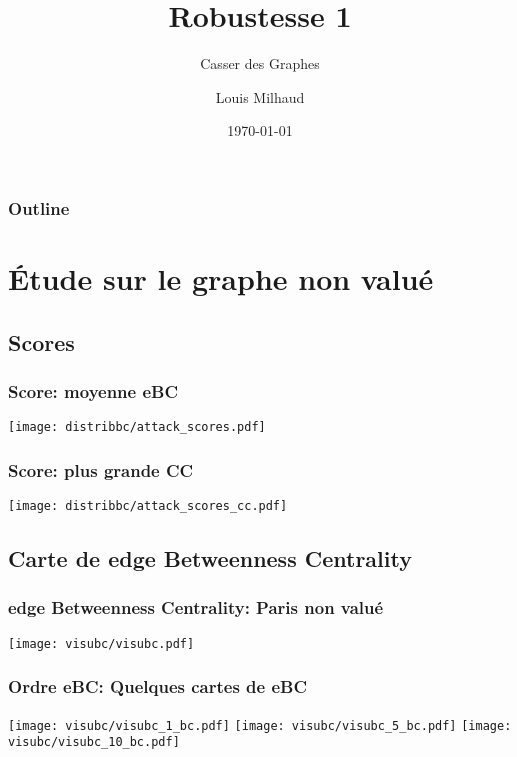 \documentclass[aspectratio=169]{beamer}
\title{Robustesse 1}
\subtitle{Casser des Graphes}
\author{Louis Milhaud}
\institute{Complex Networks - LIP6}
\date{\today}
\begin{document}
    \begin{frame}
        \titlepage
    \end{frame}

    \begin{frame}
        \frametitle{Outline}
        \tableofcontents
    \end{frame}

    \section{Étude sur le graphe non valué}
    \subsection{Scores}
    \begin{frame}
        \frametitle{Score: moyenne eBC}
        \centering
        \texttt{[image: distribbc/attack\_scores.pdf]}
    \end{frame}
    \begin{frame}
        \frametitle{Score: plus grande CC}
        \centering
        \texttt{[image: distribbc/attack\_scores\_cc.pdf]}
    \end{frame}

    \subsection{Carte de edge Betweenness Centrality}
    \begin{frame}
        \frametitle{edge Betweenness Centrality: Paris non valué}
        \centering
        \texttt{[image: visubc/visubc.pdf]}
    \end{frame}
    \begin{frame}
        \frametitle{Ordre eBC: Quelques cartes de eBC}
        \texttt{[image: visubc/visubc\_1\_bc.pdf]}
        \texttt{[image: visubc/visubc\_5\_bc.pdf]}
        \texttt{[image: visubc/visubc\_10\_bc.pdf]}
    \end{frame}
\end{document}
